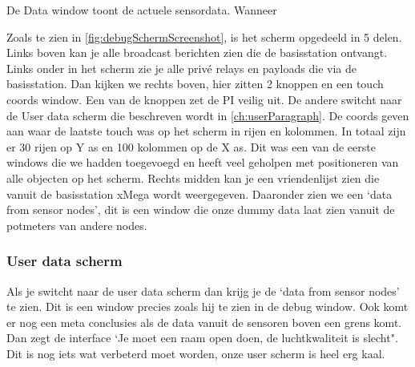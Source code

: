 De Data window toont de actuele sensordata. Wanneer


Zoals te zien in \autoref{fig:debugSchermScreenshot}, is het scherm opgedeeld in 5 delen. Links boven kan je alle broadcast berichten zien die de basisstation ontvangt. 
Links onder in het scherm zie je alle privé relays en payloads die via de basisstation. Dan kijken we rechts boven, hier zitten 2 knoppen en een touch coords window. Een van de knoppen zet de PI veilig uit. De andere switcht naar de User data scherm die beschreven wordt in \autoref{ch:userParagraph}.
De coords geven aan waar de laatste touch was op het scherm in rijen en kolommen. In totaal zijn er 30 rijen op Y as en 100 kolommen op de X as. Dit was een van de eerste windows die we hadden toegevoegd en heeft veel geholpen met positioneren van alle objecten op het scherm.
Rechts midden kan je een vriendenlijst zien die vanuit de basisstation xMega wordt weergegeven. Daaronder zien we een `data from sensor nodes', dit is een window die onze dummy data laat zien vanuit de potmeters van andere nodes. 
\subsubsection{User data scherm}\label{ch:userParagraph}
Als je switcht naar de user data scherm dan krijg je de `data from sensor nodes' te zien. Dit is een window precies zoals hij te zien in de debug window.
Ook komt er nog een meta conclusies als de data vanuit de sensoren boven een grens komt. Dan zegt de interface `Je moet een raam open doen, de luchtkwaliteit is slecht". Dit is nog iets wat verbeterd moet worden, onze user scherm is heel erg kaal.